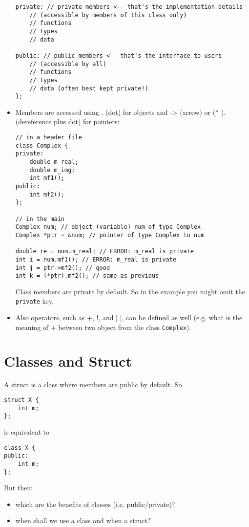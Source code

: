 \begin{itemize}[$\triangleright$]
\begin{lstlisting}
private: // private members <-- that's the implementation details 
    // (accessible by members of this class only)
    // functions
    // types
    // data

public: // public members <-- that's the interface to users
    // (accessible by all)
    // functions
    // types
    // data (often best kept private!)
};
\end{lstlisting}

\item Members are accessed using . (dot) for objects and -> (arrow) or (* ). (dereference plus dot) for pointers:
\begin{lstlisting}
// in a header file
class Complex {
private:
    double m_real;
    double m_img;
    int mf1();
public:
    int mf2();
};

// in the main
Complex num; // object (variable) num of type Complex
Complex *ptr = &num; // pointer of type Complex to num

double re = num.m_real; // ERROR: m_real is private
int i = num.mf1(); // ERROR: m_real is private
int j = ptr->mf2(); // good
int k = (*ptr).mf2(); // same as previous
\end{lstlisting}

\begin{marker}
Class members are private by default. So in the example you might omit the \texttt{private} key.
\end{marker}

\item Also operators, such as +, !, and [ ], can be defined as well (e.g. what is the meaning of + between two object from the class \texttt{Complex}).
\end{itemize}


\section{Classes and Struct} %
\label{sec:classes_and_struct}

A struct is a class where members are public by default. So
\begin{lstlisting}
struct X {
    int m;
};
\end{lstlisting}
is equivalent to
\begin{lstlisting}
class X {
public:
    int m;
};
\end{lstlisting}

But then:
\begin{itemize}
    \item which are the benefits of classes (i.e. public/private)?
    \item when shall we use a class and when a struct?
\end{itemize}

